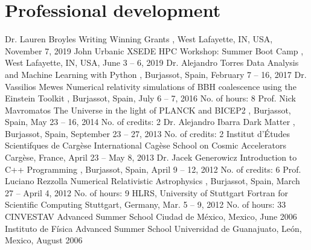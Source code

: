 \section{Professional development}

%
{Dr. Lauren Broyles}%
{Writing Winning Grants}%
{}%
{\Purdue, West Lafayette, IN, USA, November 7, 2019}%
{}
%
{John Urbanic}%
{XSEDE HPC Workshop: Summer Boot Camp}%
{}%
{\Purdue, West Lafayette, IN, USA, June 3 -- 6, 2019}%
{}
%
{Dr. Alejandro Torres}%
{Data Analysis and Machine Learning with Python}%
{}%
{\UVval, Burjassot, Spain, February 7 -- 16, 2017}%
{}
%
{Dr. Vassilios Mewes}%
{Numerical relativity simulations of BBH coalescence using the Einstein Toolkit}%
{}%
{\UVval, Burjassot, Spain, July 6 -- 7, 2016}%
{No. of hours: 8}
%
{Prof. Nick Mavromatos}%
{The Universe in the light of PLANCK and BICEP2}%
{}%
{\UVval, Burjassot, Spain, May 23 -- 16, 2014}%
{No. of credits: 2}
%
{Dr. Alejandro Ibarra}%
{Dark Matter}%
{}%
{\UVval, Burjassot, Spain, September 23 -- 27, 2013}
{No. of credits: 2}
%
{Institut d'Études Scientifques de Cargèse}%
{International Cagèse School on Cosmic Accelerators}%
{}%
{Cargèse, France, April 23 -- May 8, 2013}%
{}
%
{Dr. Jacek Generowicz}%
{Introduction to C++ Programming}%
{}%
{\UVval, Burjassot, Spain, April 9 -- 12, 2012}%
{No. of credits: 6}
%
{Prof. Luciano Rezzolla}%
{Numerical Relativistic Astrophysics}%
{}%
{\UVval, Burjassot, Spain, March 27 -- April 4, 2012}%
{No. of hours: 9}
%
{HLRS, University of Stuttgart}%
{Fortran for Scientific Computing}%
{}%
{Stuttgart, Germany, Mar. 5 -- 9, 2012}%
{No. of hours: 33}
%
{CINVESTAV}%
{Advanced Summer School}%
{}%
{Ciudad de México, Mexico, June 2006}%
{}
%
{Instituto de Física}%
{Advanced Summer School}%
{}%
{Universidad de Guanajuato, León, Mexico, August 2006}
{}
